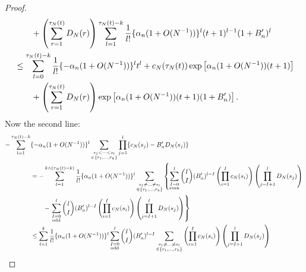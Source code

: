 \documentclass{article}
\newcommand{\1}[1]{\mathbbm{1}_{#1}}
\begin{document}
\begin{proof}
\begin{align}
&\qquad+ \left( \sum_{r=1}^{\tau_N(t)} D_N(r) \right)
\sum_{l=1}^{\tau_N(t) -k} \frac{1}{l!} \{ \alpha_n (1+O(N^{-1})) \}^l 
(t+1)^{l-1} (1+B_n^\prime)^l \notag\\
&\leq \sum_{l=0}^{\tau_N(t) -k} \frac{1}{l!} \{ - \alpha_n (1+O(N^{-1})) \}^l t^l
+ c_N(\tau_N(t)) \exp\left[ \alpha_n (1+O(N^{-1})) (t+1) \right] \notag\\
&\qquad+ \left( \sum_{r=1}^{\tau_N(t)} D_N(r) \right) \exp\left[ \alpha_n (1+O(N^{-1})) (t+1) (1+B_n^\prime) \right] %
 .
\end{align}
Now the second line:
\begin{align}
- \sum_{l=1}^{\tau_N(t) -k} &\{ -\alpha_n (1+O(N^{-1})) \}^l 
\sum_{\substack{s_1<\dots<s_l \\ \in \{r_1,\dots,r_k\} }}
\prod_{j=1}^l \{ c_N(s_j) - B_n^\prime D_N(s_j) \} \notag\\
&= - \sum_{l=1}^{k \wedge (\tau_N(t) -k)} \frac{1}{l!} \{ \alpha_n (1+O(N^{-1})) \}^l 
\sum_{\substack{s_1 \neq\dots\neq s_l \\ \in \{r_1,\dots,r_k\} }}
\left\{ \sum_{\substack{I=0\\\text{even} }}^l
\binom{l}{I} (B_n^\prime)^{l-I} 
\left( \prod_{i=1}^I c_N(s_i) \right) \left( \prod_{j=I+1}^l D_N(s_j) \right) 
\right. \notag\\
&\qquad- \left. \sum_{\substack{I=0 \\ \text{odd} }}^l
\binom{l}{I} (B_n^\prime)^{l-I} 
\left( \prod_{i=1}^I c_N(s_i) \right) \left( \prod_{j=I+1}^l D_N(s_j) \right) 
\right\} \notag\\
&\leq \sum_{l=1}^{k} \frac{1}{l!} \{ \alpha_n (1+O(N^{-1})) \}^l 
\sum_{\substack{I=0 \\ \text{odd} }}^l
\binom{l}{I} (B_n^\prime)^{l-I} 
\sum_{\substack{s_1 \neq\dots\neq s_l \\ \in \{r_1,\dots,r_k\} }}
\left( \prod_{i=1}^I c_N(s_i) \right) \left( \prod_{j=I+1}^l D_N(s_j) \right) \notag\\

\end{align}
\end{proof}
\end{document}
